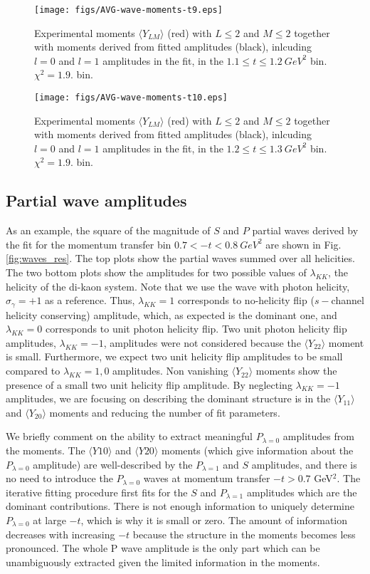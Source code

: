 \documentclass[twocolumn,superscriptaddress,prd]{revtex4}
\begin{document}
\begin{figure}
\texttt{[image: figs/AVG-wave-moments-t9.eps]}
\caption{Experimental moments $\langle Y_{LM} \rangle$ (red) with $L \leq 2$ and $M \leq 2$ together with moments derived from fitted amplitudes (black), inlcuding $l=0$ and $l=1$ amplitudes in the fit, in the $1.1 \le t \le 1.2 \ GeV^2$ bin. $\chi^2 = 1.9.$ bin.}
\label{fig:results1}
\end{figure}
\begin{figure}
\texttt{[image: figs/AVG-wave-moments-t10.eps]}
\caption{Experimental moments $\langle Y_{LM} \rangle$ (red) with $L \leq 2$ and $M \leq 2$ together with moments derived from fitted amplitudes (black), inlcuding $l=0$ and $l=1$ amplitudes in the fit, in the $1.2 \le t \le 1.3 \ GeV^2$ bin. $\chi^2 = 1.9.$ bin.}
\label{fig:mom_results_end}
\end{figure}

\subsection{Partial wave amplitudes} 
As an example, the square of the magnitude of $S$ and $P$ partial waves derived by the fit for the momentum transfer bin 
$0.7 < -t < 0.8 \ GeV^2 $ are shown in Fig. \ref{fig:waves_res}. The top plots show the partial waves summed over all helicities. The two bottom plots show the amplitudes for two possible values of $\lambda_{KK}$, the helicity of the di-kaon system. Note that we use the wave with photon helicity, $\sigma_{\gamma}=+1$ as a reference. Thus, $\lambda_{KK} = 1$ corresponds to no-helicity flip ($s-$channel helicity conserving) amplitude, which, as expected is the dominant one, and $\lambda_{KK}=0$ corresponds to unit photon helicity flip. Two unit photon helicity flip amplitudes, $\lambda_{KK}=-1$, amplitudes were not considered because the $\langle Y_{22} \rangle$ moment is small. Furthermore, we expect two unit helicity flip amplitudes to be small compared to $\lambda_{KK} = 1,0$ amplitudes. Non vanishing $\langle Y_{22} \rangle$ moments show the presence of a small two unit helicity flip amplitude. By neglecting $\lambda_{KK}=-1$ amplitudes, we are focusing on describing the dominant structure is in the $\langle Y_{11} \rangle$ and $\langle Y_{20} \rangle$ moments and reducing the number of fit parameters.  

We briefly comment on the ability to extract meaningful $P_{\lambda=0}$ amplitudes from the moments. The  $\langle Y10 \rangle$ and $\langle Y20 \rangle$ moments (which give information about the $P_{\lambda=0}$ amplitude) are well-described by the $P_{\lambda=1}$ and $S$ amplitudes, and there is no need to introduce the $P_{\lambda=0}$ waves at momentum transfer $-t > 0.7 $ GeV$^2$. The iterative fitting procedure first fits for the $S$ and $P_{\lambda=1}$ amplitudes which are the dominant contributions. There is not enough information to uniquely determine $P_{\lambda=0}$ at large $-t$, which is why it is small or zero. The amount of information decreases with increasing $-t$ because the structure in the moments becomes less pronounced. The whole P wave amplitude is the only part which can be unambiguously extracted given the limited information in the moments.
\end{document}
